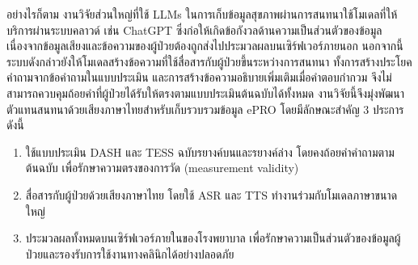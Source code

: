 อย่างไรก็ตาม งานวิจัยส่วนใหญ่ที่ใช้ LLMs ในการเก็บข้อมูลสุขภาพผ่านการสนทนาใช้โมเดลที่ให้บริการผ่านระบบคลาวด์ เช่น ChatGPT ซึ่งก่อให้เกิดข้อกังวลด้านความเป็นส่วนตัวของข้อมูล เนื่องจากข้อมูลเสียงและข้อความของผู้ป่วยต้องถูกส่งไปประมวลผลบนเซิร์ฟเวอร์ภายนอก นอกจากนี้ ระบบดังกล่าวยังให้โมเดลสร้างข้อความที่ใช้สื่อสารกับผู้ป่วยขึ้นระหว่างการสนทนา ทั้งการสร้างประโยคคำถามจากข้อคำถามในแบบประเมิน \citep{Chen2024} และการสร้างข้อความอธิบายเพิ่มเติมเมื่อคำตอบกำกวม \citep{Guo2025} จึงไม่สามารถควบคุมถ้อยคำที่ผู้ป่วยได้รับให้ตรงตามแบบประเมินต้นฉบับได้ทั้งหมด งานวิจัยนี้จึงมุ่งพัฒนาตัวแทนสนทนาด้วยเสียงภาษาไทยสำหรับเก็บรวบรวมข้อมูล ePRO โดยมีลักษณะสำคัญ 3 ประการ ดังนี้
\begin{enumerate}
    \item ใช้แบบประเมิน DASH และ TESS ฉบับรยางค์บนและรยางค์ล่าง โดยคงถ้อยคำคำถามตามต้นฉบับ เพื่อรักษาความตรงของการวัด (measurement validity)
    \item สื่อสารกับผู้ป่วยด้วยเสียงภาษาไทย โดยใช้ ASR และ TTS ทำงานร่วมกับโมเดลภาษาขนาดใหญ่
    \item ประมวลผลทั้งหมดบนเซิร์ฟเวอร์ภายในของโรงพยาบาล เพื่อรักษาความเป็นส่วนตัวของข้อมูลผู้ป่วยและรองรับการใช้งานทางคลินิกได้อย่างปลอดภัย
\end{enumerate}




